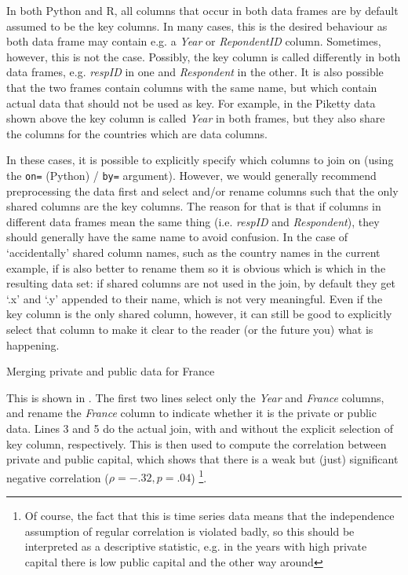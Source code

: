 In both Python and R, all columns that occur in both data frames are by default assumed to be the key columns.
In many cases, this is the desired behaviour as both data frame may contain e.g. a \emph{Year} or \emph{RepondentID} column.
Sometimes, however, this is not the case.
Possibly, the key column is called differently in both data frames, e.g. \emph{respID} in one and \emph{Respondent} in the other. 
It is also possible that the two frames contain columns with the same name,
but which contain actual data that should not be used as key.
For example, in the Piketty data shown above the key column is called \emph{Year} in both frames,
but they also share the columns for the countries which are data columns.

In these cases, it is possible to explicitly specify which columns to join on (using the \verb+on=+ (Python) / \verb+by=+ argument).
However, we would generally recommend preprocessing the data first and select and/or rename columns such that the only shared columns are the key columns.
The reason for that is that if columns in different data frames mean the same thing (i.e. \emph{respID} and \emph{Respondent}), they should generally have the same name to avoid confusion.
In the case of `accidentally' shared column names, such as the country names in the current example,
if is also better to rename them so it is obvious which is which in the resulting data set:
if shared columns are not used in the join, by default they get `.x' and `.y' appended to their name, which is not very meaningful.
Even if the key column is the only shared column, however, it can still be good to explicitly select that column to make it clear to the reader (or the future you) what is happening. 

\begin{ccsexample}
\caption{Merging private and public data for France}
\end{ccsexample}



This is shown in .
The first two lines select only the \emph{Year} and \emph{France} columns, and rename the \emph{France} column to indicate whether it is the private or public data.
Lines 3 and 5 do the actual join, with and without the explicit selection of key column, respectively.
This is then used to compute the correlation between private and public capital, 
which shows that there is a weak but (just) significant negative correlation ($\rho=-.32, p=.04$)%
\footnote{Of course, the fact that this is time series data means that the independence assumption of regular correlation is violated badly, so this should be interpreted as a descriptive statistic, e.g. in the years with high private capital there is low public capital and the other way around}.

